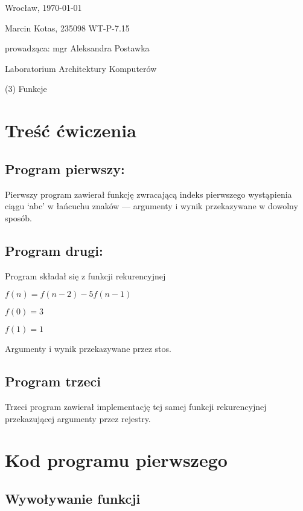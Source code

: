 \documentclass[polish, 11pt]{article}
\begin{document}
	\begin{flushright}
		Wrocław, \today
	\end{flushright}
	
	Marcin Kotas, 235098
	WT-P-7.15
	
	\begin{flushright}
		prowadząca: mgr Aleksandra Postawka
	\end{flushright}
	
	\begin{center}
		Laboratorium Architektury Komputerów
	
		(3)	Funkcje
	\end{center}
	
	\vspace{5cm}

\section{Treść ćwiczenia}
	\subsection{Program pierwszy:}
		Pierwszy program zawierał funkcję zwracającą indeks pierwszego wystąpienia ciągu `abc' w łańcuchu znaków
		--- argumenty i wynik przekazywane w dowolny sposób.

	\subsection{Program drugi:}
		Program składał się z funkcji rekurencyjnej\\
		\begin{center}
			\(f(n)=f(n-2)-5f(n-1)\)

			\(f(0)=3\)

			\(f(1)=1\)
		\end{center}
		Argumenty i wynik przekazywane przez stos.

	\subsection{Program trzeci}
		Trzeci program zawierał implementację tej samej funkcji rekurencyjnej przekazującej argumenty przez rejestry.

\newpage
\section{Kod programu pierwszego}
	\subsection{Wywoływanie funkcji}
		
\end{document}
